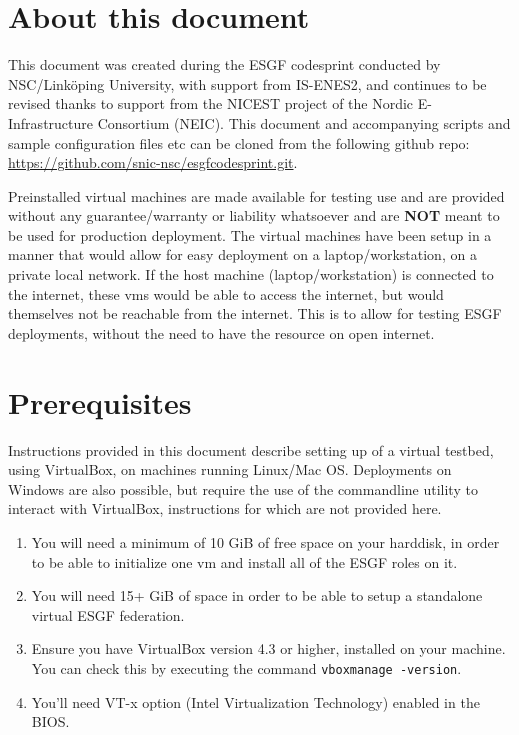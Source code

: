 \section {About this document}
This document was created during the ESGF codesprint conducted by NSC/Link\"oping University, with support from IS-ENES2, and continues to be revised thanks to support from the NICEST project of the Nordic E-Infrastructure Consortium (NEIC). 
This document and accompanying scripts and sample configuration files etc can be cloned from the following github repo:\\
\url{https://github.com/snic-nsc/esgfcodesprint.git}.
\par\vspace{2mm}\noindent
Preinstalled virtual machines are made available for testing use and are provided without any guarantee/warranty or liability whatsoever and are \textbf{NOT} meant to be used for production deployment.  The virtual machines have been setup in a manner that would allow for easy deployment on a laptop/workstation, on a private local network. If the host machine (laptop/workstation) is connected to the internet, these vms would be able to access the internet, but would themselves not be reachable from the internet. This is to allow for testing ESGF deployments, without the need to have the resource on open internet.
\section{Prerequisites}
Instructions provided in this document describe setting up of a virtual testbed, using VirtualBox, on machines running Linux/Mac OS. Deployments on Windows are also possible, but require the use of the commandline utility to interact with VirtualBox, instructions for which are not provided here.
\begin{enumerate}
\item You will need a minimum of 10 GiB of free space on your harddisk, in order to be able to initialize one vm and install all of the ESGF roles on it.
\item You will need 15+ GiB of space in order to be able to setup a standalone virtual ESGF federation.
\item Ensure you have VirtualBox version 4.3 or higher, installed on your machine. You can check this by executing the command \texttt{vboxmanage -version}.
\item You'll need VT-x option (Intel Virtualization Technology) enabled in the BIOS. 
\end{enumerate}
